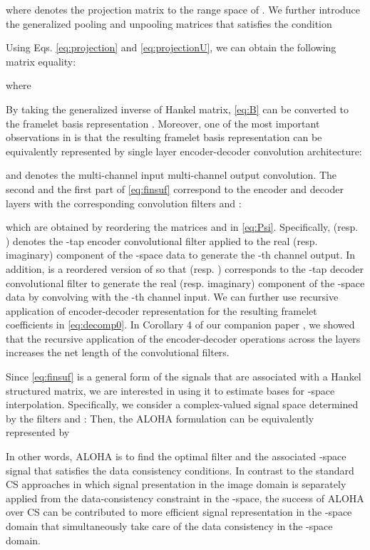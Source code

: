 \documentclass[10pt,journal]{IEEEtran}
\newcommand{\0}{{\boldsymbol{0}}}
\begin{document}
 where  denotes the projection matrix to the range space of .
 We further introduce the generalized pooling and unpooling matrices  \cite{ye2017deep} that
 satisfies the condition
 
 Using Eqs. \eqref{eq:projection} and \eqref{eq:projectionU},  we can obtain the following matrix equality:

where 

By taking the generalized inverse of Hankel matrix,  \eqref{eq:B} can be converted
to the framelet basis representation  \cite{ye2017deep}.
Moreover, one of the
most important observations in  \cite{ye2017deep}
is  that  the resulting framelet basis representation  can be equivalently represented by
single layer encoder-decoder convolution architecture:

and  
  denotes the multi-channel input multi-channel output convolution.
The second and the first part of \eqref{eq:finsuf} correspond to the encoder and decoder layers with the corresponding
 convolution filters  
 and :

which are obtained by reordering the matrices  and  in \eqref{eq:Psi}.
Specifically,   (resp. ) denotes the -tap
encoder convolutional filter applied to the  real (resp. imaginary) component of the -space data to 
generate the -th channel output.
In addition,  is a reordered version of  so that 
  (resp. ) corresponds to the -tap
decoder convolutional filter to generate the  real (resp. imaginary) component of the  -space data by
convolving with  the -th channel input.
We can further use recursive application of
encoder-decoder representation for the resulting framelet coefficients  in \eqref{eq:decomp0}.
In Corollary 4 of our companion paper \cite{ye2019cnn}, we showed that 
the recursive application of the encoder-decoder
operations across the layers
increases the net length of the convolutional filters. 




 




Since
\eqref{eq:finsuf} is a general form of the signals that are associated with a Hankel structured matrix,
 we are interested in using it to  estimate bases for -space interpolation.
 Specifically, we consider a complex-valued signal space  determined by the filters  and : 
Then, the ALOHA formulation  can be equivalently represented by

In other words, ALOHA is  to find the optimal filter  and the associated -space
signal   that satisfies the data consistency conditions.
In contrast to the standard CS approaches in which signal presentation in the image domain is separately applied
from the data-consistency constraint in  the -space,
 the success of ALOHA over CS can be contributed to more efficient signal representation in the -space domain
 that simultaneously take care of the data consistency in the -space domain.
\end{document}
